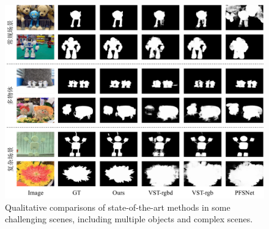 \begin{figure}
	\centering
	\includegraphics[width=\linewidth]{figures/chapter3/compare_3}
	\caption{
		Qualitative comparisons of state-of-the-art methods in some challenging scenes, including multiple objects and complex scenes.
	}
	\label{figure:figure_comparison_3}
	\vspace{-0.2cm}
\end{figure}
% 
%
